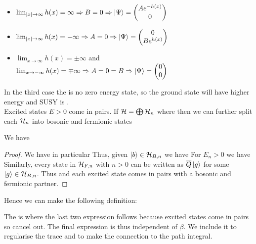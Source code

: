 \documentclass{article}
\begin{document}
\begin{itemize}
    \item $\lim_{|x|\to\infty} h(x) = \infty \Rightarrow B=0 \Rightarrow \ket{\Psi} = \begin{pmatrix} A e^{-h(x)} \\ 0 \end{pmatrix}$ 
    \item $\lim_{|x|\to\infty} h(x) = -\infty \Rightarrow A=0 \Rightarrow \ket{\Psi} = \begin{pmatrix} 0 \\ B e^{h(x)} \end{pmatrix}$ 
    \item $\lim_{x\to\infty} h(x) = \pm\infty$ and $\lim_{x\to -\infty} h(x) = \mp\infty\Rightarrow A=0=B \Rightarrow \ket{\Psi} = \begin{pmatrix} 0 \\ 0 \end{pmatrix}$ 
\end{itemize}
In the third case the is no zero energy state, so the ground state will have higher energy and SUSY is . \\
Excited states $E>0$ come in pairs. If $\mathcal{H} = \bigoplus \mathcal{H}_n$ where 
then we can further split each $\mathcal{H}_n$ into bosonic and fermionic states
\begin{prop}
	We have
\end{prop}
\begin{proof}
We have in particular 
Thus, given $\ket{b} \in \mathcal{H}_{B,n}$ we have 
For $E_n > 0$ we have 
Similarly, every state in $\mathcal{H}_{F,n}$ with $n>0$ can be written as $\overline{Q} \ket{g}$ for some $\ket{g}\in\mathcal{H}_{B,n}$. Thus 
and each excited state comes in pairs with a bosonic and fermionic partner. 
\end{proof}
Hence  we can make the following definition: 
\begin{definition}
	The  is 
	where the last two expression follows because excited states come in pairs so cancel out. The final expression is thus independent of $\beta$. We include it to regularise the trace and to make the connection to the path integral. 
\end{definition} 
\end{document}
